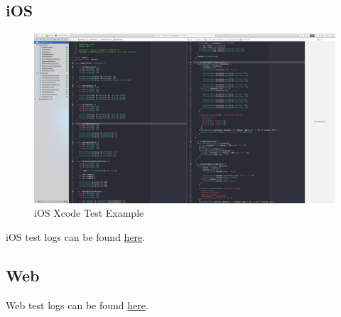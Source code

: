 \documentclass[12pt]{article}
\begin{document}
\subsection{iOS}
	\begin{figure}
	\label{fig:ie}
  	\includegraphics[width=\textwidth]{images/iosexample.png}
	\caption{iOS Xcode Test Example}
  \end{figure}
iOS test logs can be found \href{https://github.com/BinaryNinjaz/COS301-Capstone/tree/master/Source/iOS/Harvest/TestResults}{here}.
\subsection{Web}
Web test logs can be found \href{}{here}.
  
\end{document}
